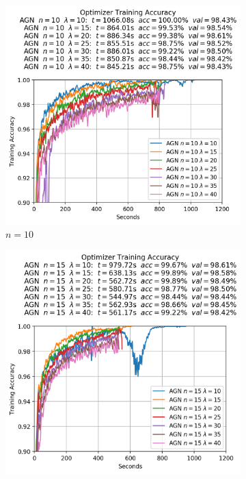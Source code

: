 \newpage
\begin{figure}
  \centering
  \begin{subfigure}{.3\textwidth}
    \centering
    \includegraphics[width=\linewidth]{resources/images/agn_experiments_workers_10}
    \caption{$n = 10$}
  \end{subfigure}
  \begin{subfigure}{.3\textwidth}
    \centering
    \includegraphics[width=\linewidth]{resources/images/agn_experiments_workers_15}

\end{subfigure}
\end{figure}
